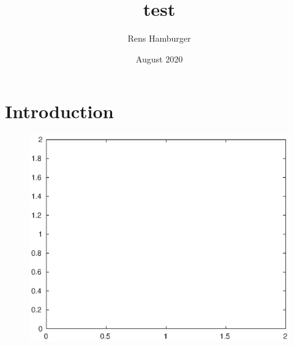\documentclass{article}
\title{test}
\author{Rens Hamburger}
\date{August 2020}
\begin{document}
\maketitle

\section{Introduction}

\begin{figure}
	\centering
	\includegraphics[width=0.6\linewidth,keepaspectratio]{figures/empty.eps}
\end{figure}
\end{document}
